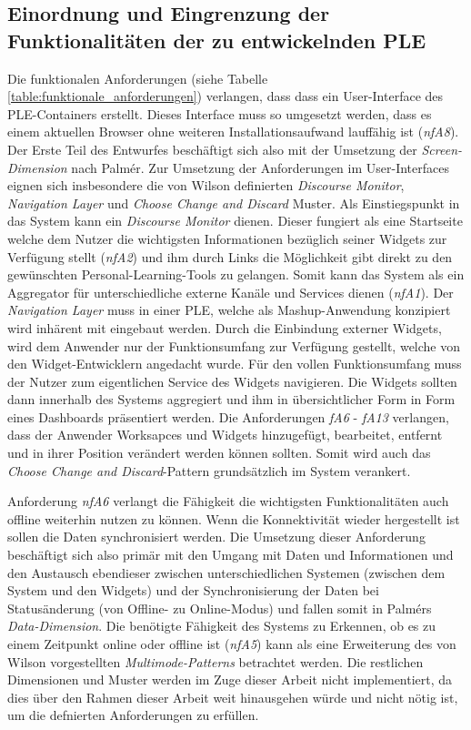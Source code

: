 \subsection{Einordnung und Eingrenzung der Funktionalitäten der zu entwickelnden PLE}
Die funktionalen Anforderungen (siehe Tabelle \ref{table:funktionale_anforderungen}) verlangen, dass dass ein User-Interface des PLE-Containers erstellt. Dieses Interface muss so umgesetzt werden, dass es einem aktuellen Browser ohne weiteren Installationsaufwand lauffähig ist (\emph{nfA8}). Der Erste Teil des Entwurfes beschäftigt sich also mit der Umsetzung der \emph{Screen-Dimension} nach Palmér. Zur Umsetzung der Anforderungen im User-Interfaces eignen sich insbesondere die von Wilson definierten \emph{Discourse Monitor}, \emph{Navigation Layer} und \emph{Choose Change and Discard} Muster. Als Einstiegspunkt in das System kann ein \emph{Discourse Monitor} dienen. Dieser fungiert als eine Startseite welche dem Nutzer die wichtigsten Informationen bezüglich seiner Widgets zur Verfügung stellt (\emph{nfA2}) und ihm durch Links die Möglichkeit gibt direkt zu den gewünschten Personal-Learning-Tools zu gelangen. Somit kann das System als ein Aggregator für unterschiedliche externe Kanäle und Services dienen (\emph{nfA1}). Der \emph{Navigation Layer} muss in einer PLE, welche als Mashup-Anwendung konzipiert wird inhärent mit eingebaut werden. Durch die Einbindung externer Widgets, wird dem Anwender nur der Funktionsumfang zur Verfügung gestellt, welche von den Widget-Entwicklern angedacht wurde. Für den vollen Funktionsumfang muss der Nutzer zum eigentlichen Service des Widgets navigieren. Die Widgets sollten dann innerhalb des Systems aggregiert und ihm in übersichtlicher Form in Form eines Dashboards präsentiert werden. Die Anforderungen \emph{fA6} - \emph{fA13} verlangen, dass der Anwender Worksapces und Widgets hinzugefügt, bearbeitet, entfernt und in ihrer Position verändert werden können sollten. Somit wird auch das \emph{Choose Change and Discard}-Pattern grundsätzlich im System verankert.  

Anforderung \emph{nfA6} verlangt die Fähigkeit die wichtigsten Funktionalitäten auch offline weiterhin nutzen zu können. Wenn die Konnektivität wieder hergestellt ist sollen die Daten synchronisiert werden. Die Umsetzung dieser Anforderung beschäftigt sich also primär mit den Umgang mit Daten und Informationen und den Austausch ebendieser zwischen unterschiedlichen Systemen (zwischen dem System und den Widgets) und der Synchronisierung der Daten bei Statusänderung (von Offline- zu Online-Modus) und fallen somit in Palmérs \emph{Data-Dimension}. Die benötigte Fähigkeit des Systems zu Erkennen, ob es zu einem Zeitpunkt online oder offline ist (\emph{nfA5}) kann als eine Erweiterung des von Wilson vorgestellten \emph{Multimode-Patterns} betrachtet werden.   
Die restlichen Dimensionen und Muster werden im Zuge dieser Arbeit nicht implementiert, da dies über den Rahmen dieser Arbeit weit hinausgehen würde und nicht nötig ist, um die defnierten Anforderungen zu erfüllen.

